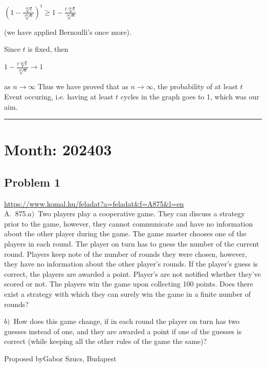 \documentclass{article}
\begin{document}
\(\displaystyle \left(1-\frac{\sqrt[10t]{t}}{\sqrt[20t]{n}}\right)^t\ge 1-\frac{t\sqrt[10t]{t}}{\sqrt[20t]{n}}\)

(we have applied Bernoulli's once more).

Since \(\displaystyle t\) is fixed, then

\(\displaystyle 1-\frac{t\sqrt[10t]{t}}{\sqrt[20t]{n}}\to 1\)

as \(\displaystyle n\to \infty\)  Thus we have proved that as \(\displaystyle n\to \infty\), the probability of at least \(\displaystyle t\) Event occuring, i.e. having at least \(\displaystyle t\) cycles in the graph goes to 1, which was our aim.

\vspace{1em}
\hrule
\vspace{1em}

\section*{Month: 202403}

\subsection*{Problem 1}
\noindent\url{https://www.komal.hu/feladat?a=feladat&f=A875&l=en}\\[1em]

A. 875.\(\displaystyle a)\) Two players play a cooperative game. They can discuss a strategy prior to the game, however, they cannot communicate and have no information about the other player during the game. The game master chooses one of the players in each round. The player on turn has to guess the number of the current round. Players keep note of the number of rounds they were chosen, however, they have no information about the other player's rounds. If the player's guess is correct, the players are awarded a point. Player's are not notified whether they've scored or not. The players win the game upon collecting 100 points. Does there exist a strategy with which they can surely win the game in a finite number of rounds?

\(\displaystyle b)\) How does this game change, if in each round the player on turn has two guesses instead of one, and they are awarded a point if one of the guesses is correct (while keeping all the other rules of the game the same)?

Proposed byGabor Szucs, Budapest
\end{document}

